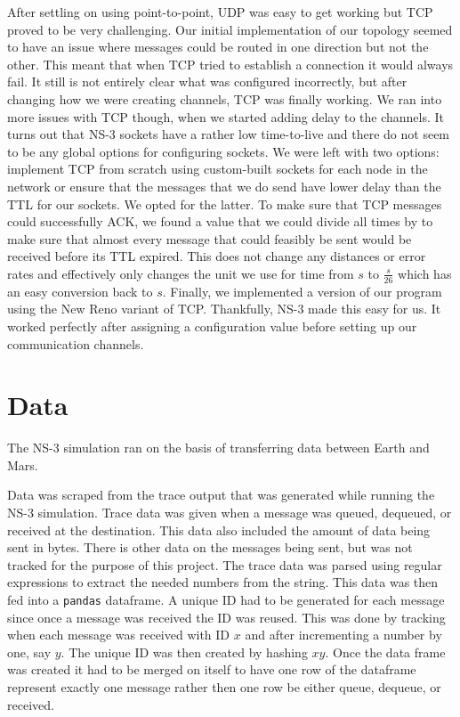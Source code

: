 \documentclass[a4paper,12pt]{article}
\begin{document}
After settling on using point-to-point, UDP was easy to get working but TCP
proved to be very challenging. Our initial implementation of our topology seemed
to have an issue where messages could be routed in one direction but not the
other. This meant that when TCP tried to establish a connection it would always
fail. It still is not entirely clear what was configured incorrectly, but after
changing how we were creating channels, TCP was finally working. We ran into
more issues with TCP though, when we started adding delay to the channels. It
turns out that NS-3 sockets have a rather low time-to-live and there do not seem
to be any global options for configuring sockets. We were left with two options:
implement TCP from scratch using custom-built sockets for each node in the
network or ensure that the messages that we do send have lower delay than the
TTL for our sockets. We opted for the latter. To make sure that TCP messages
could successfully ACK, we found a value that we could divide all times by to
make sure that almost every message that could feasibly be sent would be
received before its TTL expired. This does not change any distances or error
rates and effectively only changes the unit we use for time from $s$ to
$\frac{s}{26}$ which has an easy conversion back to $s$. Finally, we implemented
a version of our program using the New Reno variant of TCP. Thankfully, NS-3
made this easy for us. It worked perfectly after assigning a configuration value
before setting up our communication channels.

\section{Data}
The NS-3 simulation ran on the basis of transferring data between Earth and 
Mars.

Data was scraped from the trace output that was generated while running the NS-3
simulation. Trace data was given when a message was queued, dequeued, or
received at the destination. This data also included the amount of data being
sent in bytes. There is other data on the messages being sent, but was not
tracked for the purpose of this project. The trace data was parsed using regular
expressions to extract the needed numbers from the string. This data was then
fed into a \texttt{pandas} dataframe. A unique ID had to be generated for each
message since once a message was received the ID was reused. This was done by
tracking when each message was received with ID $x$ and after incrementing a
number by one, say $y$. The unique ID was then created by hashing $xy$. Once the
data frame was created it had to be merged on itself to have one row of the
dataframe represent exactly one message rather then one row be either queue,
dequeue, or received.
\end{document}
